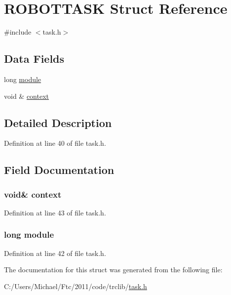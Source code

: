 \hypertarget{struct_r_o_b_o_t_t_a_s_k}{
\section{ROBOTTASK Struct Reference}
\label{struct_r_o_b_o_t_t_a_s_k}
}


{\ttfamily \#include $<$task.h$>$}

\subsection*{Data Fields}
\begin{DoxyCompactItemize}
\item 
long \hyperlink{struct_r_o_b_o_t_t_a_s_k_abdaa7ee2a453c643d91f60da69e74531}{module}
\item 
void \& \hyperlink{struct_r_o_b_o_t_t_a_s_k_a7fd0f27df248d58a9f7e9c8c3685c0f6}{context}
\end{DoxyCompactItemize}


\subsection{Detailed Description}


Definition at line 40 of file task.h.



\subsection{Field Documentation}
\hypertarget{struct_r_o_b_o_t_t_a_s_k_a7fd0f27df248d58a9f7e9c8c3685c0f6}{
\subsubsection[{context}]{\setlength{\rightskip}{0pt plus 5cm}void\& {\bf context}}}
\label{struct_r_o_b_o_t_t_a_s_k_a7fd0f27df248d58a9f7e9c8c3685c0f6}


Definition at line 43 of file task.h.

\hypertarget{struct_r_o_b_o_t_t_a_s_k_abdaa7ee2a453c643d91f60da69e74531}{
\subsubsection[{module}]{\setlength{\rightskip}{0pt plus 5cm}long {\bf module}}}
\label{struct_r_o_b_o_t_t_a_s_k_abdaa7ee2a453c643d91f60da69e74531}


Definition at line 42 of file task.h.



The documentation for this struct was generated from the following file:\begin{DoxyCompactItemize}
\item 
C:/Users/Michael/Ftc/2011/code/trclib/\hyperlink{task_8h}{task.h}\end{DoxyCompactItemize}
